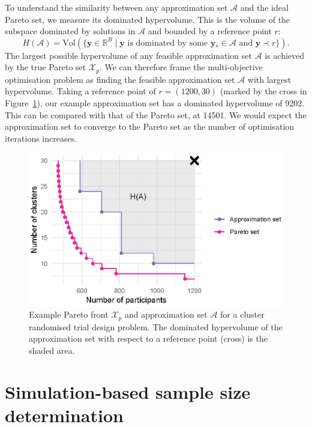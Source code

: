\documentclass[sagev]{sagej}
\begin{document}
To understand the similarity between any approximation set $\mathcal{A}$ and the ideal Pareto set, we measure its dominated hypervolume. This is the volume of the subspace dominated by solutions in $\mathcal{A}$ and bounded by a reference point $r$:
\begin{equation}
H(\mathcal{A}) = \text{Vol}(\{\mathbf{y} \in \mathbb{R}^{B} \mid \mathbf{y} \text{ is dominated by some } \mathbf{y}_{*} \in \mathcal{A} \text{ and } \mathbf{y} \prec r \}). 
\end{equation}
The largest possible hypervolume of any feasible approximation set $\mathcal{A}$ is achieved by the true Pareto set $\mathcal{X}_{p}$. We can therefore frame the multi-objective optimisation problem as finding the feasible approximation set $\mathcal{A}$ with largest hypervolume. Taking a reference point of $r = (1200, 30)$ (marked by the cross in Figure~\ref{fig:fake_pareto}), our example approximation set has a dominated hypervolume of 9202. This can be compared with that of the Pareto set, at 14501. We would expect the approximation set to converge to the Pareto set as the number of optimisation iterations increases.

\begin{figure}
\centering
\includegraphics[scale=0.8]{./figures/fake_pareto.eps}
\caption{Example Pareto front $\mathcal{X}_{p}$ and approximation set $\mathcal{A}$ for a cluster randomised trial design problem. The dominated hypervolume of the approximation set with respect to a reference point (cross) is the shaded area.}
\label{fig:fake_pareto}
\end{figure}


\section{Simulation-based sample size determination}\label{sec:methods}
\end{document}
